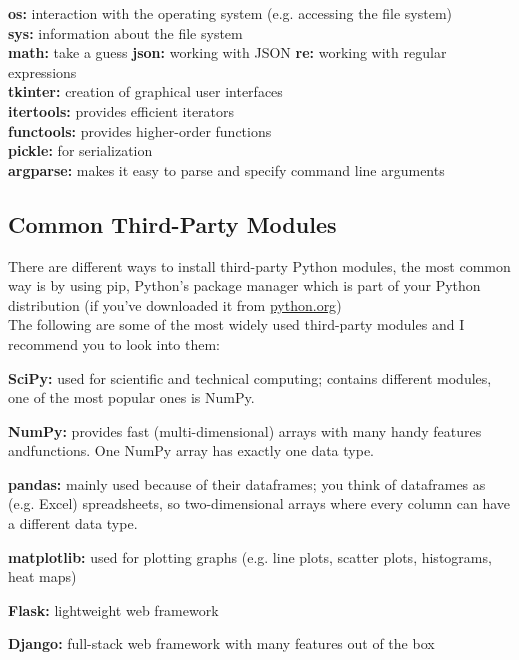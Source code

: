         \begin{indentblock}

            \textbf{os:} interaction with the operating system (e.g. accessing the file system) \\
            \textbf{sys:} information about the file system \\
            \textbf{math:} take a guess
            \textbf{json:} working with JSON
            \textbf{re:} working with regular expressions \\
            \textbf{tkinter:} creation of graphical user interfaces \\
            \textbf{itertools:} provides efficient iterators \\
            \textbf{functools:} provides higher-order functions \\
            \textbf{pickle:} for serialization \\
            \textbf{argparse:} makes it easy to parse and specify command line arguments

        \end{indentblock}

    \subsection{Common Third-Party Modules}
        There are different ways to install third-party Python modules, the most common way is by
        using pip, Python's package manager which is part of your Python distribution
        (if you've downloaded it from \href{https://python.org}{python.org})\\
        The following are some of the most widely used third-party modules and I recommend you to
        look into them:

        \begin{indentblock}

            \textbf{SciPy:} used for scientific and technical computing; contains different modules,
            one of the most popular ones is NumPy.

            \textbf{NumPy:} provides fast (multi-dimensional) arrays with many handy
            features andfunctions. One NumPy array has exactly one data type.

            \textbf{pandas:} mainly used because of their dataframes; you think of dataframes
            as (e.g. Excel) spreadsheets, so two-dimensional arrays where every column can have a
            different data type.

            \textbf{matplotlib:} used for plotting graphs (e.g. line plots, scatter plots, histograms,
            heat maps)

            \textbf{Flask:} lightweight web framework

            \textbf{Django:} full-stack web framework with many features out of the box

        \end{indentblock}
